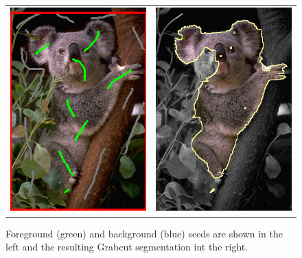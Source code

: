 \begin{figure}
\centering
\begin{tabular}{cc}
\includegraphics[scale=0.4]{figures/chapter9/segmentation/seeds.png} &
\includegraphics[scale=0.4]{figures/chapter9/segmentation/gc-seg.png}
\end{tabular}
\caption{Foreground (green) and background (blue) seeds are shown in the left and the resulting Grabcut segmentation int the right.}
\label{ch9:fig:grabcut-input-image-segmentation}
\end{figure}

